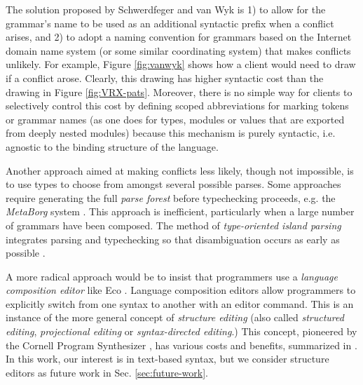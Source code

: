 {The solution proposed by Schwerdfeger and van Wyk \cite{conf/pldi/SchwerdfegerW09} is 1) to allow for the grammar's name to be used as an additional syntactic prefix when a conflict arises, and 2) to adopt a naming convention for grammars  based on the Internet domain name system (or some similar coordinating system) that makes conflicts unlikely. For example, Figure \ref{fig:vanwyk} shows how a client would need to draw  if a conflict arose. Clearly, this drawing has higher syntactic cost than the drawing in Figure \ref{fig:VRX-pats}. Moreover, there is no simple way for clients to selectively control this cost by defining scoped abbreviations for marking tokens or grammar names (as one does for types, modules or values that are exported from deeply nested modules) because this mechanism is purely syntactic, i.e. agnostic to the binding structure of the language.

Another approach aimed at making conflicts less likely, though not impossible, is to use types to choose from amongst several possible parses. Some approaches require generating the full \emph{parse forest} before typechecking proceeds, e.g. the \emph{MetaBorg} system \cite{bravenboer2005generalized}. This approach is inefficient, particularly when a large number of grammars have been composed. The method of \emph{type-oriented island parsing} integrates parsing and typechecking so that disambiguation occurs as early as possible \cite{DBLP:conf/sfp/SilkensenS12}.

A more radical approach would be to insist that programmers use a \emph{language composition editor} like Eco \cite{diekmann2014eco}. Language composition editors allow programmers to explicitly switch from one syntax to another with an editor command. This is an instance of the more general concept of \emph{structure editing} (also called \emph{structured editing}, \emph{projectional editing} or \emph{syntax-directed editing}.) This concept, pioneered by the Cornell Program Synthesizer \cite{teitelbaum_cornell_1981}, has various costs and benefits, summarized in \cite{DBLP:conf/sle/VolterSBK14}. In this work, our interest is in text-based syntax, but we consider structure editors as future work in Sec. \ref{sec:future-work}.

}

